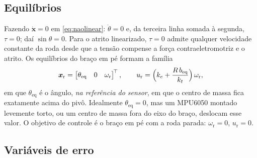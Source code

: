 \documentclass[11pt,a4paper]{article}
\newcommand{\vt}[1]{\bm{#1}}
\newcommand{\xref}{\vt{x}_{\mathrm{r}}}
\begin{document}
\subsection{Equilíbrios}

Fazendo $\dot{\vt{x}} = 0$ em \eqref{eq:naolinear}: $\dot\theta = 0$ e, da terceira linha
somada à segunda, $\tau = 0$; daí $\sin\theta = 0$. Para o atrito linearizado, $\tau = 0$
admite qualquer velocidade constante da roda desde que a tensão compense a força
contraeletromotriz e o atrito. Os equilíbrios do braço em pé formam a família
\begin{equation}
  \xref = \begin{bmatrix}\theta_{\mathrm{eq}} & 0 & \omega_{\mathrm{r}}\end{bmatrix}^{\!\top},
  \qquad
  u_{\mathrm{r}} = \Bigl(k_e + \frac{R\,b_{\text{eq}}}{k_t}\Bigr)\,\omega_{\mathrm{r}} ,
\end{equation}
em que $\theta_{\mathrm{eq}}$ é o ângulo, \emph{na referência do sensor}, em que o centro de massa
fica exatamente acima do pivô. Idealmente $\theta_{\mathrm{eq}} = 0$, mas um MPU6050 montado
levemente torto, ou um centro de massa fora do eixo do braço, deslocam esse valor. O objetivo
de controle é o braço em pé com a roda parada: $\omega_{\mathrm{r}} = 0$, $u_{\mathrm{r}} = 0$.

\subsection{Variáveis de erro}
\end{document}
